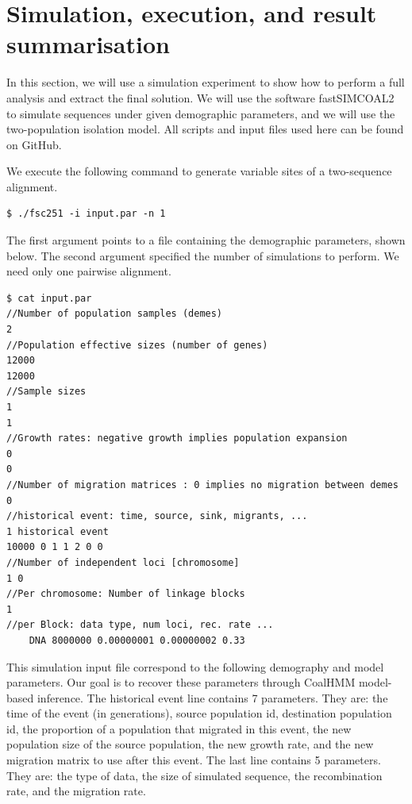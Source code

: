 \documentclass[graybox]{svmult}
\begin{document}
\section{Simulation, execution, and result summarisation}

In this section, we will use a simulation experiment to show how to perform a full analysis and extract the final solution.  We will use the software fastSIMCOAL2 \cite{excoffier2013robust} to simulate sequences under given demographic parameters, and we will use the two-population isolation model. All scripts and input files used here can be found on GitHub.

We execute the following command to generate variable sites of a two-sequence alignment.

 {\scriptsize{}\begin{verbatim}
$ ./fsc251 -i input.par -n 1
\end{verbatim}}

The first argument points to a file containing the demographic parameters, shown below.  The second argument specified the number of simulations to perform.  We need only one pairwise alignment.

 {\scriptsize{}\begin{verbatim}
$ cat input.par
//Number of population samples (demes)
2
//Population effective sizes (number of genes)
12000
12000
//Sample sizes
1
1
//Growth rates: negative growth implies population expansion
0
0
//Number of migration matrices : 0 implies no migration between demes
0
//historical event: time, source, sink, migrants, ...
1 historical event
10000 0 1 1 2 0 0
//Number of independent loci [chromosome]
1 0
//Per chromosome: Number of linkage blocks
1
//per Block: data type, num loci, rec. rate ...
    DNA 8000000 0.00000001 0.00000002 0.33
\end{verbatim}}

This simulation input file correspond to the following demography and model parameters.  Our goal is to recover these parameters through CoalHMM model-based inference.  The historical event line contains 7 parameters.  They are: the time of the event (in generations), source population id, destination population id, the proportion of a population that migrated in this event, the new population size of the source population, the new growth rate, and the new migration matrix to use after this event.  The last line contains 5 parameters.  They are: the type of data, the size of simulated sequence, the recombination rate, and the migration rate.
\end{document}
